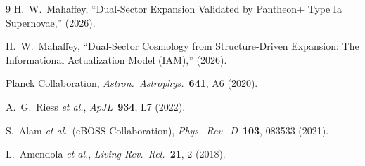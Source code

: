 \documentclass[11pt,letterpaper]{article}
\begin{document}
\begin{thebibliography}{9}
H.~W.~Mahaffey, ``Dual-Sector Expansion Validated by Pantheon+ Type Ia Supernovae,'' (2026).

H.~W.~Mahaffey, ``Dual-Sector Cosmology from Structure-Driven Expansion: The Informational Actualization Model (IAM),'' (2026).

Planck Collaboration, \textit{Astron.\ Astrophys.}\ \textbf{641}, A6 (2020).

A.~G.~Riess \textit{et al.}, \textit{ApJL}\ \textbf{934}, L7 (2022).

S.~Alam \textit{et al.}\ (eBOSS Collaboration), \textit{Phys.\ Rev.\ D}\ \textbf{103}, 083533 (2021).

L.~Amendola \textit{et al.}, \textit{Living Rev.\ Rel.}\ \textbf{21}, 2 (2018).
\end{thebibliography}
\end{document}
